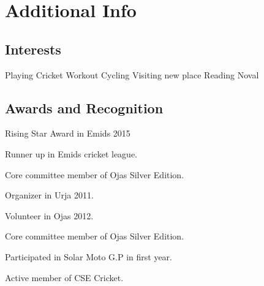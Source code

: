 \documentclass[]{deedy-resume-openfont}
\begin{document}
\begin{minipage}[t]{0.33\textwidth}
\section{Additional Info}
\subsection{Interests}
\vspace{\topsep} %
Playing Cricket \textbullet{} Workout \textbullet{} Cycling \textbullet{} Visiting new place \textbullet{} Reading Noval
\sectionsep


\subsection{Awards and Recognition}
\vspace{\topsep}
\begin{tightemize}
\vspace{\topsep}
\item Rising Star Award in Emids 2015
\item Runner up in Emids cricket league.
\item Core committee member of Ojas Silver Edition.
\item Organizer in Urja 2011.
\item Volunteer in Ojas 2012.
\item Core committee member of Ojas Silver Edition.
\item Participated in Solar Moto G.P in first year.
\item Active member of CSE Cricket.
\end{tightemize}
\sectionsep

%
%

\end{minipage} 
\hfill
\end{document}

